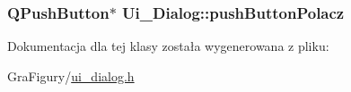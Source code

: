 \hypertarget{classUi__Dialog_a80234b371a2b143b74be0c4351ad2267}{
\subsubsection[{push\-Button\-Polacz}]{\setlength{\rightskip}{0pt plus 5cm}Q\-Push\-Button$\ast$ Ui\-\_\-\-Dialog\-::push\-Button\-Polacz}}\label{classUi__Dialog_a80234b371a2b143b74be0c4351ad2267}


Dokumentacja dla tej klasy została wygenerowana z pliku\-:\begin{DoxyCompactItemize}
\item 
Gra\-Figury/\hyperlink{ui__dialog_8h}{ui\-\_\-dialog.\-h}\end{DoxyCompactItemize}
